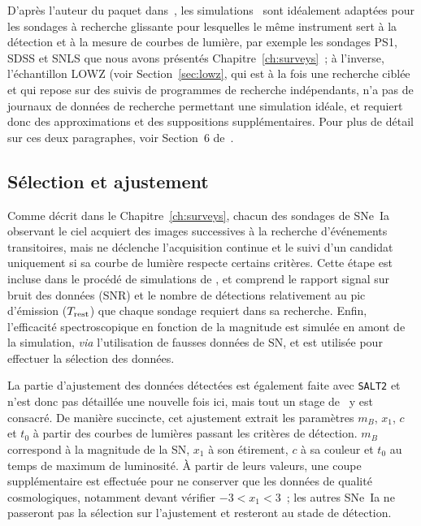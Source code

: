 \documentclass[../main/main.tex]{subfiles}
\begin{document}
D'après l'auteur du paquet dans~\cite{kessler2019}, les simulations \snana\ sont
idéalement adaptées pour les sondages à recherche glissante pour lesquelles le
même instrument sert à la détection et à la mesure de courbes de lumière, par
exemple les sondages PS1, SDSS et SNLS que nous avons présentés
Chapitre~\ref{ch:surveys}~; à l'inverse, l'échantillon LOWZ (voir
Section~\ref{sec:lowz}, qui est à la fois une recherche ciblée et qui repose sur
des suivis de programmes de recherche indépendants, n'a pas de journaux de
données de recherche permettant une simulation idéale, et requiert donc des
approximations et des suppositions supplémentaires. Pour plus de détail sur ces
deux paragraphes, voir Section~6 de~\cite{kessler2019}.

\subsection{Sélection et ajustement}\label{ssec:simdetec}

Comme décrit dans le Chapitre~\ref{ch:surveys}, chacun des sondages de SNe~Ia
observant le ciel acquiert des images successives à la recherche d'événements
transitoires, mais ne déclenche l'acquisition continue et le suivi d'un candidat
uniquement si sa courbe de lumière respecte certains critères. Cette étape est
incluse dans le procédé de simulations de \snana, et comprend le rapport signal
sur bruit des données (SNR) et le nombre de détections relativement au pic
d'émission ($T_{\rm rest}$) que chaque sondage requiert dans sa recherche.
Enfin, l'efficacité spectroscopique en fonction de la magnitude est simulée en
amont de la simulation, \textit{via} l'utilisation de fausses données de SN, et
est utilisée pour effectuer la sélection des données.

La partie d'ajustement des données détectées est également faite avec
\texttt{SALT2} et n'est donc pas détaillée une nouvelle fois ici, mais tout un
stage de \snana\ y est consacré. De manière succincte, cet ajustement extrait
les paramètres $m_B$, $x_1$, $c$ et $t_0$ à partir des courbes de lumières
passant les critères de détection. $m_B$ correspond à la magnitude de la SN,
$x_1$ à son étirement, $c$ à sa couleur et $t_0$ au temps de maximum de
luminosité. À partir de leurs valeurs, une coupe supplémentaire est effectuée
pour ne conserver que les données de qualité cosmologiques, notamment devant
vérifier $-3 < x_1 < 3$~; les autres SNe~Ia ne passeront pas la sélection sur
l'ajustement et resteront au stade de détection.
\end{document}
